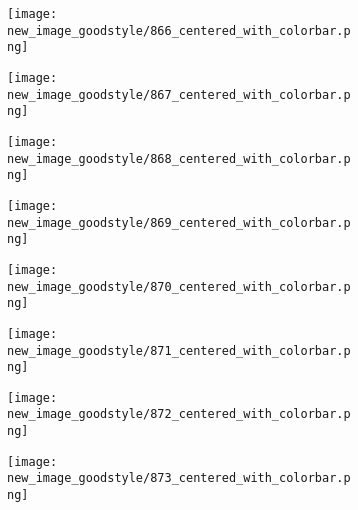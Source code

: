 \documentclass[a4paper,12pt]{article}
\begin{document}
\begin{figure}[H]
  \begin{subfigure}{0.11\textwidth}
    \texttt{[image: new\_image\_goodstyle/866\_centered\_with\_colorbar.png]}
  \end{subfigure}
  \hfill
  \begin{subfigure}{0.11\textwidth}
    \texttt{[image: new\_image\_goodstyle/867\_centered\_with\_colorbar.png]}
  \end{subfigure}
  \hfill
  \begin{subfigure}{0.11\textwidth}
    \texttt{[image: new\_image\_goodstyle/868\_centered\_with\_colorbar.png]}
  \end{subfigure}
  \hfill
  \begin{subfigure}{0.11\textwidth}
    \texttt{[image: new\_image\_goodstyle/869\_centered\_with\_colorbar.png]}
  \end{subfigure}
  \hfill
  \begin{subfigure}{0.11\textwidth}
    \texttt{[image: new\_image\_goodstyle/870\_centered\_with\_colorbar.png]}
  \end{subfigure}
  \hfill
  \begin{subfigure}{0.11\textwidth}
    \texttt{[image: new\_image\_goodstyle/871\_centered\_with\_colorbar.png]}
  \end{subfigure}
  \hfill
  \begin{subfigure}{0.11\textwidth}
    \texttt{[image: new\_image\_goodstyle/872\_centered\_with\_colorbar.png]}
  \end{subfigure}
  \hfill
  \begin{subfigure}{0.11\textwidth}
    \texttt{[image: new\_image\_goodstyle/873\_centered\_with\_colorbar.png]}
  \end{subfigure}
  \hfill
\end{figure}
\end{document}
